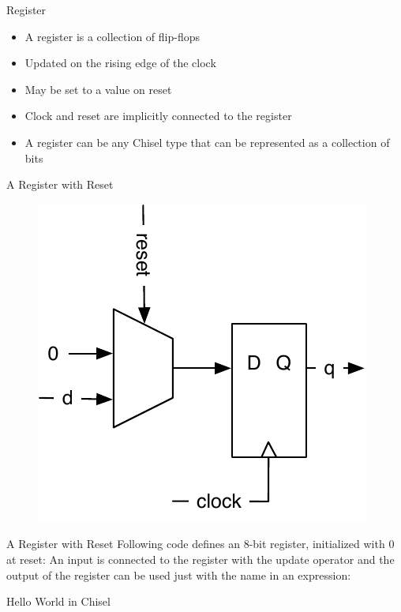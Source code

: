 \begin{frame}[fragile]{Register}
\begin{itemize}
\item A register is a collection of flip-flops
\item Updated on the rising edge of the clock
\item May be set to a value on reset
\item Clock and reset are implicitly connected to the register
\item A register can be any Chisel type that can be represented as a collection of bits
\end{itemize}
\end{frame}

\begin{frame}[fragile]{A Register with Reset}
\begin{figure}
  \includegraphics[scale=\scale]{../figures/register-reset-0}
\end{figure}
\end{frame}


\begin{frame}[fragile]{A Register with Reset}
Following code defines an 8-bit register, initialized with 0 at reset:
\noindent An input is connected to the register with the \code{:=} update operator and
the output of the register can be used just with the name in an expression:
\end{frame}


\begin{frame}[fragile]{Hello World in Chisel}
\end{frame}

